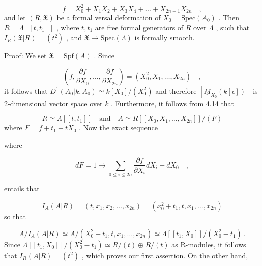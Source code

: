 \begin{equation*}
f = X_0^2 + X_1X_2 + X_3X_4 + \ldots + X_{2n-1}X_{2n} \quad ,
\end{equation*}
\underline{and let}  $(R, \mathfrak{X})$  \underline{be a formal versal deformation of}  $X_0 = \mathrm{Spec}(A_0)$  . \underline{Then} $R = \Lambda[[t, t_1]]$  , \underline{where}  $t, t_1$  \underline{are free formal generators of}  $R$  \underline{over}  $\Lambda$  , \underline{such} \underline{that}  $I_R(\mathfrak{X}|R) = (t^2)$  , \underline{and}  $\mathfrak{X} \to \mathrm{Spec}(\Lambda)$  \underline{is formally smooth.}

\underline{Proof:}  We set  $\mathfrak{X} = \mathrm{Spf}(A)$  . Since

\begin{equation*}
(f, \frac{\partial f}{\partial X_0} , \ldots , \frac{\partial f}{\partial X_{2n}} ) = (X_0^2, X_1, \ldots , X_{2n}) \quad ,
\end{equation*}
it follows that  $D^1(A_0|k, A_0) \simeq  k[X_0]/(X_0^2)$  and therefore  $[\underline{M}_{X_0}(k[\epsilon])]$  is 2-dimensional vector space over  $k$  . Furthermore, it follows from 4.14 that

\begin{equation*}
R \simeq \Lambda[[t, t_1]] \quad \text{and} \quad A \simeq R[[X_0, X_1, \ldots ,X_{2n}]]/(F)
\end{equation*}
where  $F = f + t_1 + tX_0$  . Now the exact sequence

\begin{center}
\end{center}
where

\begin{equation*}
dF = 1 \to \sum_{0 \leq i \leq 2n} \frac{\partial f}{\partial X_i} dX_i + dX_0 \quad , 
\end{equation*}


 entails that

\begin{equation*}
I_A(A|R) = (t, x_1, x_2, \ldots, x_{2n}) = (x_0^2 + t_1, t, x_1, \ldots, x_{2n})
\end{equation*}
so that

\begin{equation*}
A/I_A(A|R) \simeq A/(X_0^2 + t_1, t, x_1, \ldots, x_{2n}) \simeq \Lambda[[t_1, X_0]]/(X_0^2 - t_1)  \ .
\end{equation*}
Since  $\Lambda[[t_1, X_0]]/(X_0^2 - t_1) \simeq R/(t) \oplus R/(t)$  as R-modules, it follows that $I_R(A|R) = (t^2)$  , which proves our first assertion. On the other hand,


